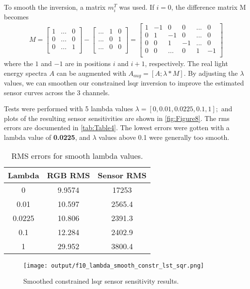 \documentclass[12pt]{report}
\begin{document}
\begin{enumerate}
    To smooth the inversion, a matrix $m_{i}^{T}$ was used. If $i = 0$, the difference matrix M becomes
    $$
    \begin{aligned}
    M = 
    \begin{bmatrix}
    1 & ... & 0 \\
    0 & ... & 0 \\
    0 & ... & 1 \\
    \end{bmatrix}
    -
    \begin{bmatrix}
    ... & 1 & 0 \\
    ... & 0 & 1 \\
    ... & 0 & 0 \\
    \end{bmatrix}
    =
    \begin{bmatrix}
    1 & -1 & 0 & 0 & ... & 0 \\
    0 & 1 & -1 & 0 & ... & 0 \\
    0 & 0 & 1 & -1 & ... & 0 \\
    0 & 0 & ... & 0 & 1 & -1 \\
    \end{bmatrix}
    \end{aligned}
    $$
    where the $1$ and $-1$ are in positions $i$ and $i+1$, respectively. The real light energy spectra $A$ can 
    be augmented with $A_{aug} = [A; \lambda * M]$. By adjusting the $\lambda$ values, we can smoothen our constrained lsqr inversion 
    to improve the estimated sensor curves across the 3 channels.  
    
    Tests were performed with 5 lambda values $\lambda = [0, 0.01, 0.0225, 0.1, 1];$ and plots of the resulting sensor sensitivities 
    are shown in \autoref{fig:Figure8}. The rms errors are documented in \autoref{tab:Table4}. The lowest errors were gotten with a 
    lambda value of \textbf{0.0225}, and $\lambda$ values above 0.1 were generally too smooth.

    \begin{table}[h!]
    \begin{center}
    \begin{tabular}{| c | c | c |} 
        \hline
        Lambda & RGB RMS & Sensor RMS \\ 
        \hline \hline
        0       &  9.9574 &  17253 \\
        0.01    &  10.597 &  2565.4 \\
        0.0225  &  10.806 &  2391.3 \\
        0.1     &  12.284 &  2402.9 \\
        1       &  29.952 &  3800.4 \\
        \hline
    \end{tabular}
    \caption{RMS errors for smooth lambda values.}
    \label{tab:Table4}
    \end{center}
    \end{table}

    \begin{figure}[ht!]
        \centering
        \texttt{[image: output/f10\_lambda\_smooth\_constr\_lst\_sqr.png]}
        \caption{Smoothed constrained lsqr sensor sensitivity results.}
        \label{fig:Figure8}
    \end{figure}

\end{enumerate}
\end{document}
